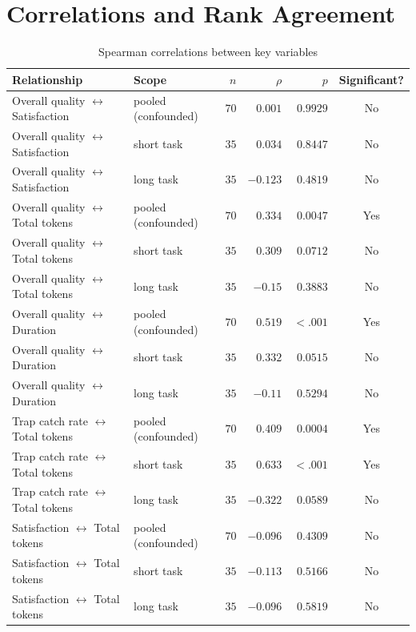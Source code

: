 \clearpage
\section{Correlations and Rank Agreement}

\begin{table}[htbp]
  \centering
  \small
  \caption{Spearman correlations between key variables}
  \label{tab:03-correlations}
\begin{tabular}{>{\raggedright\arraybackslash}p{4.8cm}>{\raggedright\arraybackslash}p{4.2cm}rrrc}
    \toprule
    Relationship & Scope & $n$ & $\rho$ & $p$ & Significant? \\
    \midrule
    Overall quality  $\leftrightarrow$  Satisfaction & pooled (confounded) & $70$ & $0.001$ & $0.9929$ & No \\
    Overall quality  $\leftrightarrow$  Satisfaction & short task & $35$ & $0.034$ & $0.8447$ & No \\
    Overall quality  $\leftrightarrow$  Satisfaction & long task & $35$ & $-0.123$ & $0.4819$ & No \\
    Overall quality  $\leftrightarrow$  Total tokens & pooled (confounded) & $70$ & $0.334$ & $0.0047$ & Yes \\
    Overall quality  $\leftrightarrow$  Total tokens & short task & $35$ & $0.309$ & $0.0712$ & No \\
    Overall quality  $\leftrightarrow$  Total tokens & long task & $35$ & $-0.15$ & $0.3883$ & No \\
    Overall quality  $\leftrightarrow$  Duration & pooled (confounded) & $70$ & $0.519$ & $<.001$ & Yes \\
    Overall quality  $\leftrightarrow$  Duration & short task & $35$ & $0.332$ & $0.0515$ & No \\
    Overall quality  $\leftrightarrow$  Duration & long task & $35$ & $-0.11$ & $0.5294$ & No \\
    Trap catch rate  $\leftrightarrow$  Total tokens & pooled (confounded) & $70$ & $0.409$ & $0.0004$ & Yes \\
    Trap catch rate  $\leftrightarrow$  Total tokens & short task & $35$ & $0.633$ & $<.001$ & Yes \\
    Trap catch rate  $\leftrightarrow$  Total tokens & long task & $35$ & $-0.322$ & $0.0589$ & No \\
    Satisfaction  $\leftrightarrow$  Total tokens & pooled (confounded) & $70$ & $-0.096$ & $0.4309$ & No \\
    Satisfaction  $\leftrightarrow$  Total tokens & short task & $35$ & $-0.113$ & $0.5166$ & No \\
    Satisfaction  $\leftrightarrow$  Total tokens & long task & $35$ & $-0.096$ & $0.5819$ & No \\
    \bottomrule
\end{tabular}%
\end{table}

